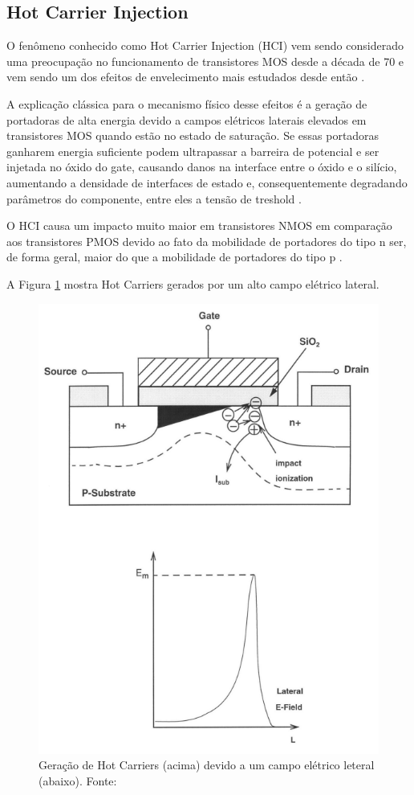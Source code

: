 \subsection{Hot Carrier Injection}

O fenômeno conhecido como Hot Carrier Injection (HCI) vem sendo considerado uma preocupação no funcionamento de transistores MOS desde a década de 70 e vem sendo um dos efeitos de envelecimento mais estudados desde então \cite{Butzen}.

A explicação clássica para o mecanismo físico desse efeitos é a geração de portadoras de alta energia devido a campos elétricos laterais elevados em transistores MOS quando estão no estado de saturação. Se essas portadoras ganharem energia suficiente podem ultrapassar a barreira de potencial e ser injetada no óxido do gate, causando danos na interface entre o óxido e o silício, aumentando a densidade de interfaces de estado e, consequentemente degradando parâmetros do componente, entre eles a tensão de treshold \cite{Cacho}.

O HCI causa um impacto muito maior em transistores NMOS em comparação aos transistores PMOS devido ao fato da mobilidade de portadores do tipo n ser, de forma geral, maior do que a mobilidade de portadores do tipo p \cite{Jiang}.

A Figura \ref{fig:hci} mostra Hot Carriers gerados por um alto campo elétrico lateral.

\begin{figure}[H]
    \centering
    \includegraphics[scale=0.5]{figures/ReferencialTeorico/HCI.png}
    \caption{Geração de Hot Carriers (acima) devido a um campo elétrico leteral (abaixo). Fonte: \cite{Jiang}}
    \label{fig:hci}
\end{figure}

